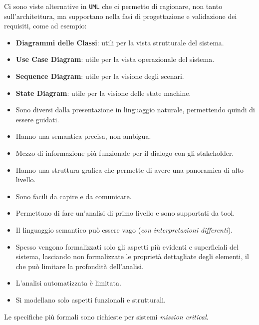 Ci sono viste alternative in \texttt{UML} che ci permetto di ragionare, non tanto 
sull'architettura, ma supportano nella fasi di progettazione e validazione dei requisiti,
come ad esempio:
\begin{itemize}
    \item \textbf{Diagrammi delle Classi}: utili per la vista strutturale del sistema.
    \item \textbf{Use Case Diagram}: utile per la vista operazionale del sistema.
    \item \textbf{Sequence Diagram}: utile per la visione degli scenari.
    \item \textbf{State Diagram}: utile per la visione delle state machine.
\end{itemize}

\begin{tcolorbox}[colback=green!5!white,colframe=green!75!black,title=Vantaggi
    dell'ausilio di Diagrammi]
    \begin{itemize}
        \item Sono diversi dalla presentazione in linguaggio naturale, permettendo
        quindi di essere guidati.
        \item Hanno una semantica precisa, non ambigua.
        \item Mezzo di informazione più funzionale per il dialogo con gli stakeholder.
        \item Hanno una struttura grafica che permette di avere una panoramica di 
        alto livello.
        \item Sono facili da capire e da comunicare.
        \item Permettono di fare un'analisi di primo livello e sono supportati da tool.
    \end{itemize}
\end{tcolorbox}
\begin{tcolorbox}[colback=red!5!white,colframe=red!75!black,title=Svantaggi
    dell'ausilio di Diagrammi]
    \begin{itemize}
        \item Il linguaggio semantico può essere vago (\textit{con interpretazioni differenti}).
        \item Spesso vengono formalizzati solo gli aspetti più evidenti e superficiali del
        sistema, lasciando non formalizzate le proprietà dettagliate degli
        elementi, il che può limitare la profondità dell'analisi.
        \item L'analisi automatizzata è limitata.
        \item Si modellano solo aspetti funzionali e strutturali.
    \end{itemize}
\end{tcolorbox}
Le specifiche più formali sono richieste per sistemi \textit{mission critical}.